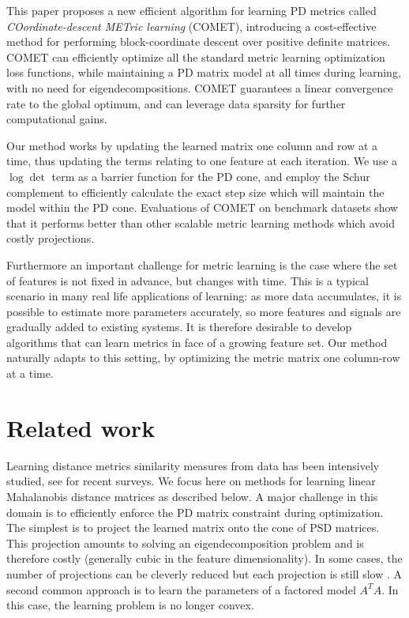 \documentclass{article} %
\begin{document}
This paper proposes a new efficient algorithm for learning PD metrics called  {\em{COordinate-descent METric learning}} (COMET), introducing a cost-effective method for performing block-coordinate descent over positive definite matrices.
COMET can efficiently optimize all the standard metric learning optimization loss functions, while maintaining a PD matrix model at all times during learning, with no need for eigendecompositions. COMET guarantees a linear convergence rate to the global optimum, and can leverage data sparsity for further computational gains. 

Our method works by updating the learned matrix one column and row at a time, thus updating the terms relating to one feature at each iteration. We use a $\log \det$ term as a barrier function for the PD cone, and employ the Schur complement to efficiently calculate the exact step size which will maintain the model within the PD cone. Evaluations of COMET on benchmark datasets show that it performs better than other scalable metric learning methods which avoid costly projections. 

Furthermore an important challenge for metric learning is the case where the set of features is not fixed in advance, but changes with time. This is a typical scenario in many real life applications of learning: as more data accumulates, it is possible to estimate more parameters accurately, so more features and signals are gradually added to existing systems. It is therefore desirable to develop algorithms that can learn metrics in face of a growing feature set. Our method naturally adapts to this setting, by optimizing the metric matrix one column-row at a time.



\section{Related work}
Learning distance metrics similarity measures from data has been intensively studied, see \citet{bellet2013survey, kulis2012survey} for recent surveys. We focus here on methods for learning linear Mahalanobis distance matrices as described below. A major challenge in this domain is to efficiently enforce the PD matrix constraint during optimization. The simplest is to project the learned matrix onto the cone of PSD matrices. This projection amounts to solving an eigendecomposition problem and is therefore costly (generally cubic in the feature dimensionality). In some cases, the number of projections can be cleverly reduced but each projection is still slow \cite{qianHD, qian}. A second common approach is to learn the parameters of a factored model $A^TA$. In this case, the learning problem is no longer convex. 
\end{document}
